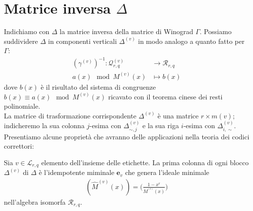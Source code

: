\section{Matrice inversa $\Delta$}
Indichiamo con $\Delta$ la matrice inversa della matrice di Winograd $\Gamma$. Possiamo suddividere $\Delta$ in componenti verticali $\Delta^{(v)}$ in modo analogo a quanto fatto per $\Gamma$:
\begin{align*}
  (\gamma^{(v)})^{-1} :  \mathcal{Q}_{r,q}^{(v)}    
  & \longrightarrow  
  \mathcal{R}_{r,q}
   \\
  a(x) \mod{M^{(v)}(x)}
  &\longmapsto  
  b(x) 
\end{align*}
dove $b(x)$ è il risultato del sistema di congruenze $b(x) \equiv a(x) \mod{M^{(v)} (x) }$ ricavato con il teorema cinese dei resti polinomiale. \\
La matrice di trasformazione corrispondente $\Delta^{(v)}$ è una matrice $r\times m(v)$; indicheremo la sua colonna $j$-esima con $\Delta_{\sim, j}^{(v)}$ e la sua riga $i$-esima con $\Delta_{i, \sim}^{(v)}$.\\
Presentiamo alcune proprietà che avranno delle applicazioni nella teoria dei codici correttori:
\begin{prop} \label{prop:idempotGeneratori}
   Sia $v \in \mathscr{L}_{r,q}$ elemento dell'insieme delle etichette. La prima colonna di ogni blocco $\Delta^{(v)}$ di $\Delta$ è l'idempotente miminale $\mathbf{e}_{v}$ che genera l'ideale minimale 
   \begin{align*}
      (\hat{M}^{(v)}(x)) = \Big(\frac{1-x^r}{M^{^(v)}(x)} \Big)
   \end{align*}
    nell'algebra isomorfa $\mathcal{R}_{r,q}$.
\end{prop}
